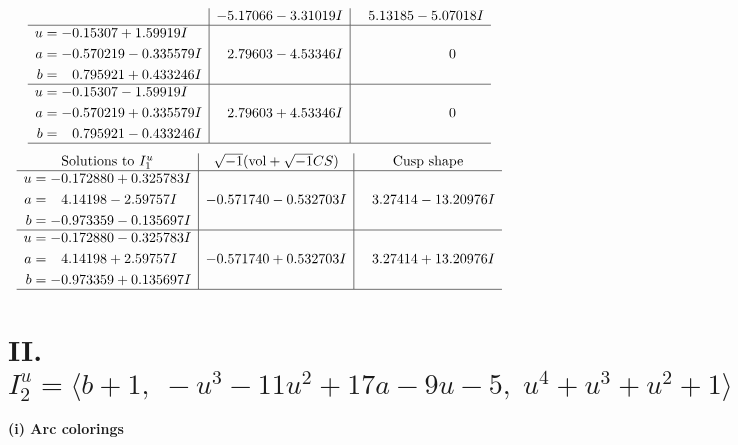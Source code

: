 \documentclass[1p]{elsarticle_modified}
\theoremstyle{definition}
\newcommand{\I}{\sqrt{-1}}
\begin{document}
$$\begin{array}{c|c|c}
 & -5.17066 - 3.31019 I & \phantom{-}5.13185 - 5.07018 I \\ \hline\begin{aligned}
u &= -0.15307 + 1.59919 I \\
a &= -0.570219 - 0.335579 I \\
b &= \phantom{-}0.795921 + 0.433246 I\end{aligned}
 & \phantom{-}2.79603 - 4.53346 I & \phantom{-0.000000 } 0 \\ \hline\begin{aligned}
u &= -0.15307 - 1.59919 I \\
a &= -0.570219 + 0.335579 I \\
b &= \phantom{-}0.795921 - 0.433246 I\end{aligned}
 & \phantom{-}2.79603 + 4.53346 I & \phantom{-0.000000 } 0\\
 \hline 
 \end{array}$$\newpage$$\begin{array}{c|c|c}  
\text{Solutions to }I^u_{1}& \I (\text{vol} + \sqrt{-1}CS) & \text{Cusp shape}\\
 \hline 
\begin{aligned}
u &= -0.172880 + 0.325783 I \\
a &= \phantom{-}4.14198 - 2.59757 I \\
b &= -0.973359 - 0.135697 I\end{aligned}
 & -0.571740 - 0.532703 I & \phantom{-}3.27414 - 13.20976 I \\ \hline\begin{aligned}
u &= -0.172880 - 0.325783 I \\
a &= \phantom{-}4.14198 + 2.59757 I \\
b &= -0.973359 + 0.135697 I\end{aligned}
 & -0.571740 + 0.532703 I & \phantom{-}3.27414 + 13.20976 I\\
 \hline 
 \end{array}$$\newpage\newpage\renewcommand{\arraystretch}{1}
\centering \section*{II. $I^u_{2}= \langle b+1,\;- u^3-11 u^2+17 a-9 u-5,\;u^4+u^3+u^2+1 \rangle$}
\flushleft \textbf{(i) Arc colorings}\\
\end{document}
